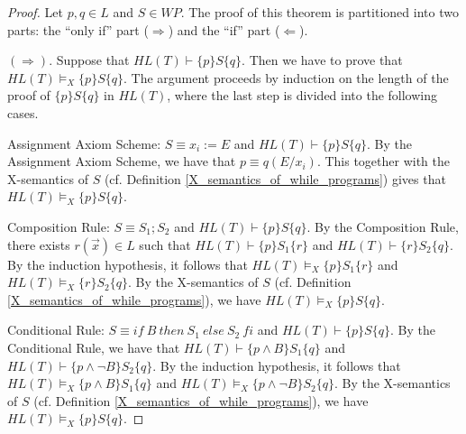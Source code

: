 \documentclass[a4paper,11pt]{article}
\begin{document}
\begin{proof}
Let $p,q\in L$ and $S\in WP$. The proof of this theorem is partitioned into two parts: the ``only if'' part ($\Rightarrow$) and the ``if'' part ($\Leftarrow$).

$(\Rightarrow)$. Suppose that $HL(T)\vdash \{p\} S \{q\}$. Then we have to prove that $HL(T)\models_X \{p\} S \{q\}$. The argument proceeds by induction on the length of the proof of $\{p\} S \{q\}$ in $HL(T)$, where the last step is divided into the following cases.

Assignment Axiom Scheme: $S\equiv x_i := E$ and $HL(T)\vdash \{p\} S \{q\}$. By the Assignment Axiom Scheme, we have that $p \equiv q(E/x_i)$. This together with the X-semantics of $S$ (cf. Definition \ref{X_semantics_of_while_programs}) gives that $HL(T)\models_X \{p\} S \{q\}$.

Composition Rule: $S \equiv S_1;S_2$ and $HL(T) \vdash \{p\}S\{q\}$. By the Composition Rule, there exists $r(\vec{x})\in L$ such that $HL(T) \vdash \{p\} S_1 \{r\}$ and $HL(T) \vdash \{r\} S_2 \{q\}$. By the induction hypothesis, it follows that $HL(T) \models_X \{p\} S_1 \{r\}$ and $HL(T) \models_X \{r\} S_2 \{q\}$. By the X-semantics of $S$ (cf. Definition \ref{X_semantics_of_while_programs}), we have $HL(T)\models_X \{p\} S \{q\}$.

Conditional Rule: $S \equiv if\ B\ then\ S_1\ else\ S_2\ fi$ and $HL(T) \vdash \{p\} S \{q\}$. By the Conditional Rule, we have that $HL(T) \vdash \{p \wedge B\} S_1 \{q\}$ and $HL(T)\vdash  \{p \wedge \neg B \} S_2 \{q\}$. By the induction hypothesis, it follows that $HL(T) \models_X \{p \wedge B\} S_1 \{q\}$ and $HL(T)\models_X  \{p \wedge \neg B \} S_2 \{q\}$. By the X-semantics of $S$ (cf. Definition \ref{X_semantics_of_while_programs}), we have $HL(T)\models_X \{p\} S \{q\}$.


\end{proof}
\end{document}
